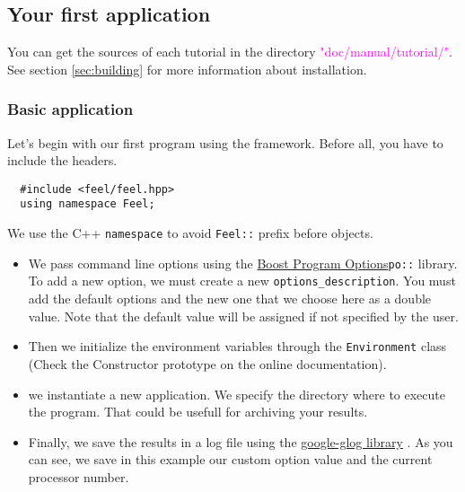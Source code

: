     
\subsection{Your first application}
\label{sec:firstapp}

You can get the sources of each tutorial in the directory 
\textcolor{magenta}{"doc/manual/tutorial/"}.
See section \ref{sec:building} for more information about \feel installation.

\subsubsection{Basic application}
%
Let's begin with our first program using the \feel framework.
Before all, you have to include the \feel headers.
%
\vspace{2mm}
\begin{lstlisting}
  #include <feel/feel.hpp>
  using namespace Feel;
\end{lstlisting}
\vspace{2mm}
%
We use the C++ \lstinline!namespace! to avoid \lstinline!Feel::! prefix before
\feel objects.
%
\vspace{2mm}

\vspace{2mm}
%
\begin{itemize}
\item 
We pass command line options using the
\href{http://www.boost.org/doc/libs/1_53_0/doc/html/program_options.html}
{Boost Program Options}\footnotemark[1] \lstinline!po::! library.
%
%
To add a new \feel option, we must create a new
\feel \lstinline!options_description!. You must add the default \feel options
and the new one that we choose here as a double value. Note that the default
value will be assigned if not specified by the user.

\item
Then we initialize the environment variables through the \feel
\lstinline!Environment! class (Check the Constructor prototype on the online documentation).

\item 
we instantiate a new application. We specify the directory where to execute the
program. That could be usefull for archiving your results.

\item
Finally, we save the results in a log file using the
\href{http://code.google.com/p/google-glog/}{google-glog library}
\footnotemark[2].
%
%
As you can see, we save in this example our custom option value and the 
current processor number.

\end{itemize}



